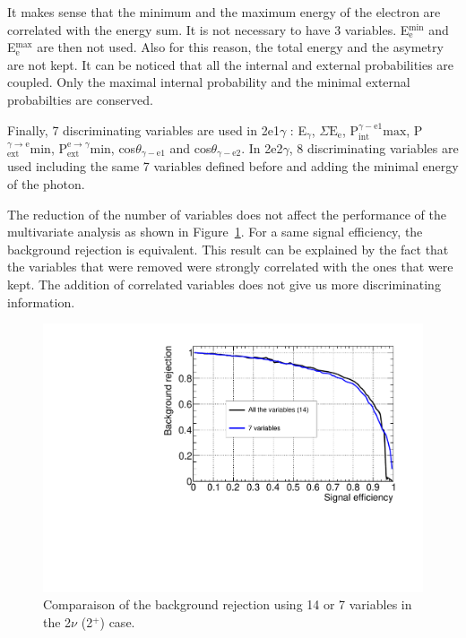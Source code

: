 \documentclass[main.tex]{subfiles}
\begin{document}
\NI It makes sense that the minimum and the maximum energy of the electron are correlated with the energy sum. It is not necessary to have 3 variables. E$_\text{e}^{\text{min}}$ and E$_\text{e}^{\text{max}}$ are then not used. Also for this reason, the total energy and the asymetry are not kept. It can be noticed that all the internal and external probabilities are coupled. Only the maximal internal probability and the minimal external probabilties are conserved.


\bigskip


\NI Finally, 7 discriminating variables are used in 2e1$\gamma$ : E$_{\gamma}$, $\Sigma\text{E}_\text{e}$, P$_{\text{int}}^{\gamma-\text{e1}} \text{max}$, P$_{\text{ext}}^{\gamma \rightarrow \text{e}} \text{min}$, P$_{\text{ext}}^{\text{e} \rightarrow \gamma} \text{min}$, cos$\theta_{\gamma-\text{e1}}$ and cos$\theta_{\gamma-\text{e2}}$. In 2e2$\gamma$, 8 discriminating variables are used including the same 7 variables defined before and adding the minimal energy of the photon.


\bigskip


\NI The reduction of the number of variables does not affect the performance of the multivariate analysis as shown in Figure~\ref{CompareTMVA}. For a same signal efficiency, the background rejection is equivalent. This result can be explained by the fact that the variables that were removed were strongly correlated with the ones that were kept. The addition of correlated variables does not give us more discriminating information.




\begin{figure} [h!]
\begin{center}
\includegraphics[scale=0.50]{pictures/FinalResults/bb2nu2/150/preselection/CompareTMVAReductionVar.pdf}
\end{center}
\caption{Comparaison of the background rejection using 14 or 7 variables in the 2$\nu$ (2$^+$) case.}
\label{CompareTMVA}
\end{figure}
\end{document}
